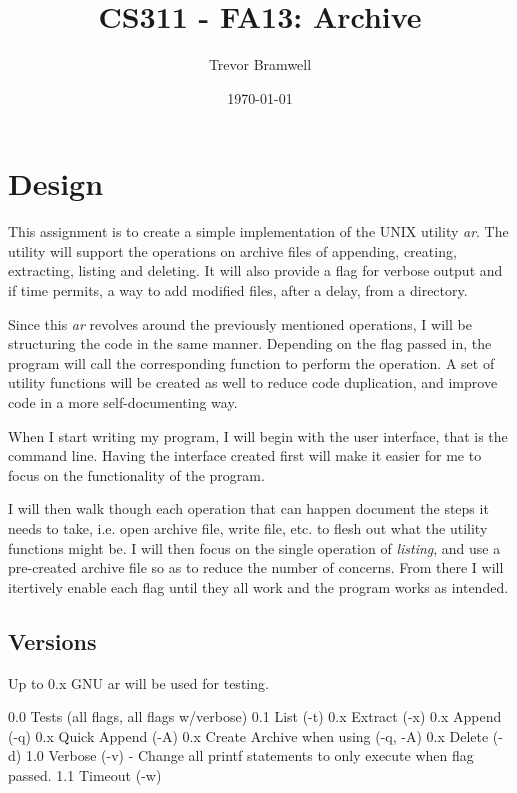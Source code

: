 \documentclass[letterpaper,10pt]{article}
\title{CS311 - FA13: Archive}
\date{\today}
\author{Trevor Bramwell}
\begin{document}
\maketitle

\section{Design}
    This assignment is to create a simple implementation of the UNIX
    utility \emph{ar}. The utility will support the operations on archive files
    of appending, creating, extracting, listing and deleting. It will
    also provide a flag for verbose output and if time permits, a way to
    add modified files, after a delay, from a directory.

    Since this \emph{ar} revolves around the previously mentioned
    operations, I will be structuring the code in the same manner.
    Depending on the flag passed in, the program will call the
    corresponding function to perform the operation. A set of utility
    functions will be created as well to reduce code duplication, and
    improve code in a more self-documenting way.

    When I start writing my program, I will begin with the user
    interface, that is the command line. Having the interface created
    first will make it easier for me to focus on the functionality of
    the program.

    I will then walk though each operation that can happen document the
    steps it needs to take, i.e. open archive file, write file, etc. to
    flesh out what the utility functions might be. I will then focus on
    the single operation of \emph{listing}, and use a pre-created
    archive file so as to reduce the number of concerns. From there I
    will itertively enable each flag until they all work and the program
    works as intended.

\subsection{Versions}

Up to 0.x GNU ar will be used for testing.

    0.0 Tests (all flags, all flags w/verbose)
    0.1 List (-t)
    0.x Extract (-x)
    0.x Append (-q)
    0.x Quick Append (-A)
    0.x Create Archive when using (-q, -A)
    0.x Delete (-d)
    1.0 Verbose (-v) - Change all printf statements to only execute when flag
                       passed.
    1.1 Timeout (-w)
        
\end{document}
